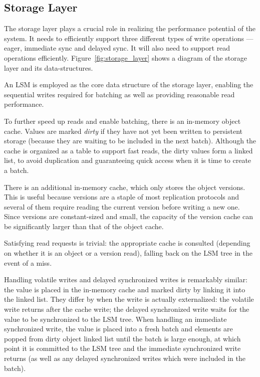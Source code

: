 \subsection{Storage Layer}\label{ssec:storage}

The storage layer plays a crucial role in realizing the
performance potential of the system. It needs to efficiently support
three different types of write operations --- eager, immediate
sync and delayed sync. It will also need to support read operations
efficiently. Figure~\ref{fig:storage_layer} shows a diagram of
the storage layer and its data-structures.

An LSM is employed as the core data structure of the storage
layer, enabling the sequential writes required for batching as
well as providing reasonable read performance.

To further speed up reads and enable batching, there is an in-memory
object cache. Values are marked \emph{dirty} if they have not yet been
written to persistent storage (because they are waiting to be
included in the next batch). Although the cache is organized as a
table to support fast reads, the dirty values form a linked list,
to avoid duplication and guaranteeing quick access when it is
time to create a batch.

There is an additional in-memory cache, which only stores the
object versions. This is useful because versions are a staple of
most replication protocols and several of them require reading
the current version before writing a new one. Since versions are
constant-sized and small, the capacity of the version cache can
be significantly larger than that of the object cache.

Satisfying read requests is trivial: the appropriate cache is
consulted (depending on whether it is an object or a version
read), falling back on the LSM tree in the event of a miss.

Handling volatile writes and delayed synchronized writes is remarkably similar: the
value is placed in the in-memory cache and marked dirty by
linking it into the linked list. They differ by when the write is
actually externalized: the volatile write returns after the cache
write; the delayed synchronized write waits for the value to be
synchronized to the LSM tree. When handling an immediate
synchronized write, the value is
placed into a fresh batch and elements are popped from dirty
object linked list until the batch is large enough, at which
point it is committed to the LSM tree and the immediate synchronized write
returns (as well as any delayed synchronized writes which were included
in the batch).


